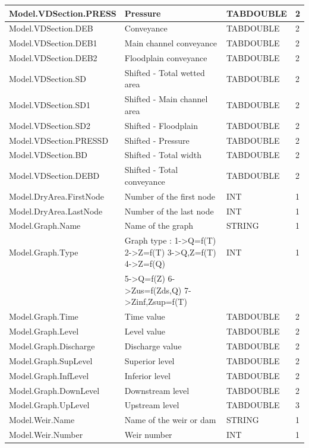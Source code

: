 \documentclass[a4paper,11pt]{article}
\begin{document}
\begin{landscape}
\begin{table}[ht]
\begin{center}
\begin{tabular}{|l|l|l|l|}
\hline  Model.VDSection.PRESS & Pressure & TABDOUBLE & 2 \\
\hline  Model.VDSection.DEB & Conveyance & TABDOUBLE & 2 \\
\hline  Model.VDSection.DEB1 & Main channel conveyance & TABDOUBLE & 2 \\
\hline  Model.VDSection.DEB2 & Floodplain conveyance & TABDOUBLE & 2 \\
\hline  Model.VDSection.SD & Shifted - Total wetted area & TABDOUBLE & 2 \\
\hline  Model.VDSection.SD1 & Shifted - Main channel area & TABDOUBLE & 2 \\
\hline  Model.VDSection.SD2 & Shifted - Floodplain & TABDOUBLE & 2 \\
\hline  Model.VDSection.PRESSD & Shifted  - Pressure & TABDOUBLE & 2 \\
\hline  Model.VDSection.BD & Shifted - Total width & TABDOUBLE & 2 \\
\hline  Model.VDSection.DEBD & Shifted - Total conveyance & TABDOUBLE & 2 \\
\hline  Model.DryArea.FirstNode & Number of the first node & INT & 1 \\
\hline  Model.DryArea.LastNode & Number of the last node & INT & 1 \\
\hline  Model.Graph.Name & Name of the graph & STRING & 1 \\
\hline  Model.Graph.Type & Graph type : 1->Q=f(T) 2->Z=f(T) 3->Q,Z=f(T) 4->Z=f(Q) & INT & 1 \\
                         &              5->Q=f(Z) 6->Zus=f(Zds,Q) 7->Zinf,Zsup=f(T) &  &  \\
\hline  Model.Graph.Time & Time value & TABDOUBLE & 2 \\
\hline  Model.Graph.Level & Level value & TABDOUBLE & 2 \\
\hline  Model.Graph.Discharge & Discharge value & TABDOUBLE & 2 \\
\hline  Model.Graph.SupLevel & Superior level & TABDOUBLE & 2 \\
\hline  Model.Graph.InfLevel & Inferior level & TABDOUBLE & 2 \\
\hline  Model.Graph.DownLevel & Downstream level & TABDOUBLE & 2 \\
\hline  Model.Graph.UpLevel & Upstream level & TABDOUBLE & 3 \\
\hline  Model.Weir.Name & Name of the weir or dam & STRING & 1 \\
\hline  Model.Weir.Number & Weir number & INT & 1 \\

\end{tabular}
\end{center}
\end{table}
\end{landscape}
\end{document}
